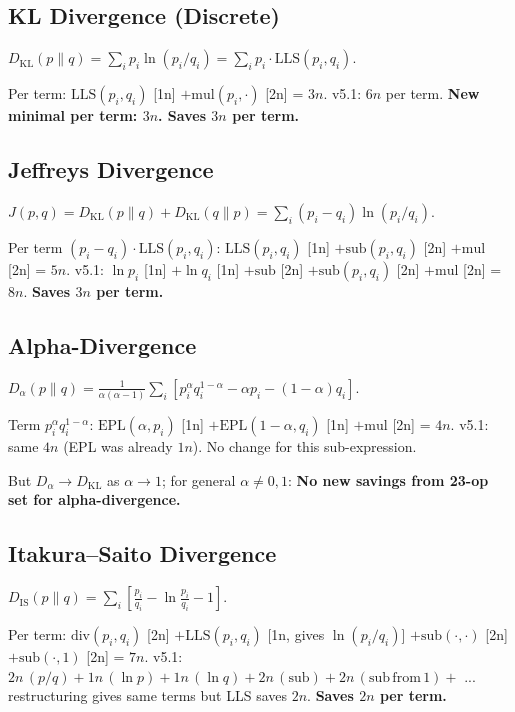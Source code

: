 \documentclass[11pt]{article}
\begin{document}
\subsection{KL Divergence (Discrete)}

$D_\mathrm{KL}(p\|q)=\sum_i p_i\ln(p_i/q_i)=\sum_i p_i\cdot\mathrm{LLS}(p_i,q_i)$.

Per term: $\mathrm{LLS}(p_i,q_i)$ [1n] $+\mathrm{mul}(p_i,\cdot)$ [2n] = $3n$.
v5.1: $6n$ per term. \textbf{New minimal per term: $3n$. Saves $3n$ per term.}

\subsection{Jeffreys Divergence}

$J(p,q)=D_\mathrm{KL}(p\|q)+D_\mathrm{KL}(q\|p)=\sum_i(p_i-q_i)\ln(p_i/q_i)$.

Per term $(p_i-q_i)\cdot\mathrm{LLS}(p_i,q_i)$:
$\mathrm{LLS}(p_i,q_i)$ [1n] $+\mathrm{sub}(p_i,q_i)$ [2n] $+\mathrm{mul}$ [2n] = $5n$.
v5.1: $\ln p_i$ [1n] $+\ln q_i$ [1n] $+\mathrm{sub}$ [2n] $+\mathrm{sub}(p_i,q_i)$ [2n] $+\mathrm{mul}$ [2n] = $8n$.
\textbf{Saves $3n$ per term.}

\subsection{Alpha-Divergence}

$D_\alpha(p\|q)=\frac{1}{\alpha(\alpha-1)}\sum_i\!\left[p_i^\alpha q_i^{1-\alpha}-\alpha p_i-(1-\alpha)q_i\right]$.

Term $p_i^\alpha q_i^{1-\alpha}$:
$\mathrm{EPL}(\alpha,p_i)$ [1n] $+\mathrm{EPL}(1-\alpha,q_i)$ [1n] $+\mathrm{mul}$ [2n] = $4n$.
v5.1: same $4n$ (EPL was already $1n$). No change for this sub-expression.

But $D_\alpha\to D_\mathrm{KL}$ as $\alpha\to1$; for general $\alpha\neq0,1$:
\textbf{No new savings from 23-op set for alpha-divergence.}

\subsection{Itakura--Saito Divergence}

$D_\mathrm{IS}(p\|q)=\sum_i\!\left[\frac{p_i}{q_i}-\ln\frac{p_i}{q_i}-1\right]$.

Per term: $\mathrm{div}(p_i,q_i)$ [2n] $+\mathrm{LLS}(p_i,q_i)$ [1n, gives $\ln(p_i/q_i)$]
$+\mathrm{sub}(\cdot,\cdot)$ [2n] $+\mathrm{sub}(\cdot,1)$ [2n] = $7n$.
v5.1: $2n\,(p/q)+1n\,(\ln p)+1n\,(\ln q)+2n\,(\mathrm{sub})+2n\,(\mathrm{sub\,from\,1})+$ ... restructuring gives same terms but LLS saves $2n$.
\textbf{Saves $2n$ per term.}
\end{document}
